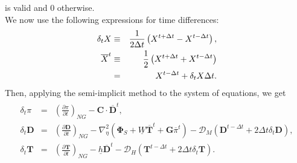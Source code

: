 is valid and 0 otherwise.\\
We now use the following expressions for time differences: \begin{eqnarray}\begin{aligned}
  \delta_{t} {X} &\equiv & \frac{1}{2 \Delta t}
        \left( {X}^{t+\Delta t} - {X}^{t-\Delta t} \right), \\
    \overline{X}^{t} &\equiv & \frac{1}{2} \left( {X}^{t+\Delta t}  + {X}^{t-\Delta t} \right)\notag\\
  &=&  {X}^{t-\Delta t} + \delta_{t} {X} \Delta t.\end{aligned}\end{eqnarray} Then, applying the semi-implicit method to the system of equations, we get \begin{eqnarray}\begin{aligned}
\label{eqn_for_pi}
  \delta_{t} \pi &=&
          \left( \frac{\partial \pi}{\partial t} \right)_{NG}
     - {\mathbf{C}} \cdot \overline{ {\mathbf{D}} }^{t}, \\
  \delta_{t} {\mathbf{D}} &=&
          \left( \frac{\partial {\mathbf{D}}}{\partial t} \right)_{NG}
          - \nabla^{2}_{\eta} ( {\mathbf{\Phi}}_{S}
                                  + \underline{W}
                                     \overline{ {\mathbf{T}} }^{t}
                                  + {\mathbf{G}}
                                  \overline{\pi}^{t} )
          - {\mathcal D}_M ( {\mathbf{D}}^{t-\Delta t}
                         + 2 \Delta t \delta_{t} {\mathbf{D}} ), \\
\label{eqn_for_t}
  \delta_{t} {\mathbf{T}} &=&
        \left( \frac{\partial {\mathbf{T}}}{\partial t} \right)_{NG}
         - \underline{h} \overline{ {\mathbf{D}} }^{t}
         - {\mathcal D}_H ( {\mathbf{T}}^{t-\Delta t}
                        + 2 \Delta t \delta_{t} {\mathbf{T}} ).\end{aligned}\end{eqnarray}

